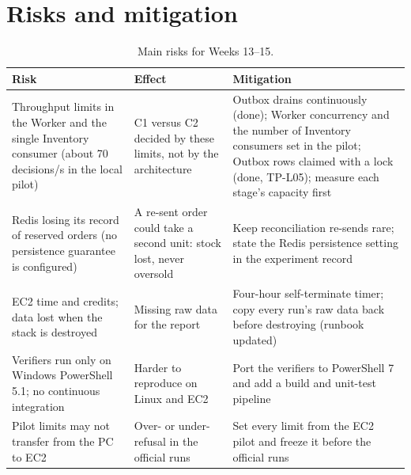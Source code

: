 \documentclass[12pt,a4paper]{article}
\begin{document}
\section{Risks and mitigation}

\begin{table}[H]
\centering\small
\caption{Main risks for Weeks 13--15.}
\label{tab:risks}
\begin{tabularx}{\textwidth}{YYY}
\toprule
Risk & Effect & Mitigation \\
\midrule
Throughput limits in the Worker and the single Inventory consumer (about
70 decisions/s in the local pilot) & C1 versus C2 decided by these limits,
not by the architecture & Outbox drains continuously (done); Worker
concurrency and the number of Inventory consumers set in the pilot; Outbox
rows claimed with a lock (done, TP-L05);
measure each stage's capacity first \\
Redis losing its record of reserved orders (no persistence guarantee is
configured) & A re-sent order could take a second unit: stock lost, never
oversold & Keep reconciliation re-sends rare; state the Redis persistence
setting in the experiment record \\
EC2 time and credits; data lost when the stack is destroyed & Missing raw data
for the report & Four-hour self-terminate timer; copy every run's raw data
back before destroying (runbook updated) \\
Verifiers run only on Windows PowerShell 5.1; no continuous integration &
Harder to reproduce on Linux and EC2 & Port the verifiers to PowerShell 7 and
add a build and unit-test pipeline \\
Pilot limits may not transfer from the PC to EC2 & Over- or under-refusal in
the official runs & Set every limit from the EC2 pilot and freeze it before
the official runs \\
\bottomrule
\end{tabularx}
\end{table}

\end{document}

